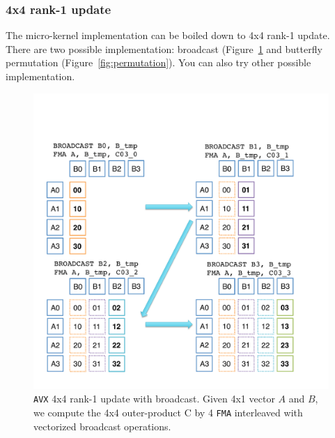 \subsubsection{4x4 rank-1 update}
The micro-kernel implementation can be boiled down to 4x4 rank-1 update. There are two possible implementation: broadcast (Figure~\ref{fig:broadcast} and butterfly permutation (Figure~\ref{fig:permutation}). You can also try other possible implementation.
\begin{figure}
\begin{center}
	\includegraphics[width=5in]{figures/avx_broadcast.pdf}
\end{center}
\caption{{\tt AVX} 4x4 rank-1 update with broadcast. Given 4x1 vector $A$ and $B$, we compute the 4x4 outer-product C by 4 {\tt FMA} interleaved with vectorized broadcast operations.}
\label{fig:broadcast}
\end{figure}

